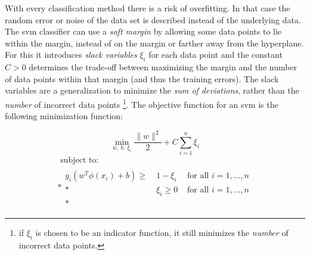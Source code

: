 With every classification method there is a risk of overfitting.
In that case the random error or noise of the data set is described instead of the underlying data.
The \gls{svm} classifier can use a \emph{soft margin} by allowing some data points to lie within the margin, instead of on the margin or farther away from the hyperplane.
For this it introduces \emph{slack variables} $\xi_i$ for each data point and the constant $C > 0$ determines the trade-off between maximizing the margin and the number of data points within that margin (and thus the training errors).
The slack variables are a generalization to minimize the \emph{sum of deviations}, rather than the \emph{number} of incorrect data points \cite{cherkassky2007learning}\footnote{if $\xi_i$ is chosen to be an indicator function, it still minimizes the \emph{number} of incorrect data points.}.
The objective function for an \gls{svm} is the following minimization function:

\begin{equation}\label{eq:svm_objective}
  \operatorname*{min}_{w,\ b,\ \xi_i} \frac{ \lVert{w}\rVert^2 }{2} + C \sum_{i=1}^n \xi_i
\end{equation}
\begin{equation}
  \begin{multlined}
  \mbox{ subject to: } \\*
  \begin{aligned}
  y_i( w^T \phi(x_i) + b) \geq \: & 1 - \xi_i & \mbox{ for all } i = 1, \dots, n \\*
   & \xi_i \geq 0 & \mbox{ for all } i = 1, \dots, n\\*
  \end{aligned}
  \end{multlined}
\end{equation}

